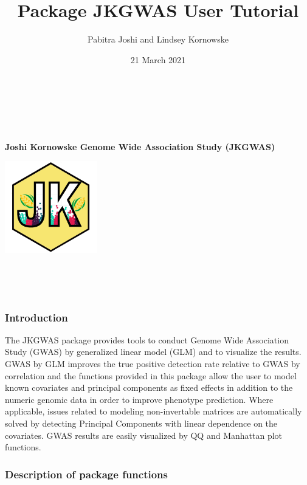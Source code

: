 \documentclass[
]{article}
\title{Package JKGWAS User Tutorial}
\author{Pabitra Joshi and Lindsey Kornowske}
\date{21 March 2021}
\begin{document}
\maketitle

{
\setcounter{tocdepth}{6}
\tableofcontents
}
~

~

\begin{center}
\textbf{Joshi Kornowske Genome Wide Association Study (JKGWAS)}\par
\includegraphics[width = 0.3\textwidth]{JKGWAS/JKGWAS_logo.png}
\end{center}

~

~

\hypertarget{introduction}{%
\subsubsection{\texorpdfstring{\textbf{Introduction}}{Introduction}}\label{introduction}}

The JKGWAS package provides tools to conduct Genome Wide Association
Study (GWAS) by generalized linear model (GLM) and to visualize the
results. GWAS by GLM improves the true positive detection rate relative
to GWAS by correlation and the functions provided in this package allow
the user to model known covariates and principal components as fixed
effects in addition to the numeric genomic data in order to improve
phenotype prediction. Where applicable, issues related to modeling
non-invertable matrices are automatically solved by detecting Principal
Components with linear dependence on the covariates. GWAS results are
easily visualized by QQ and Manhattan plot functions.

\hypertarget{description-of-package-functions}{%
\subsubsection{\texorpdfstring{\textbf{Description of package
functions}}{Description of package functions}}\label{description-of-package-functions}}
\end{document}
